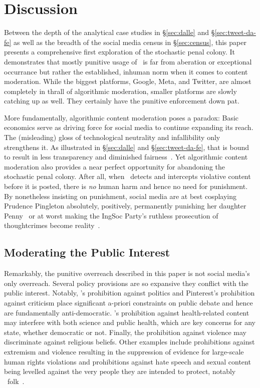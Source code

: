 \section{Discussion}
\label{sec:discussion}

Between the depth of the analytical case studies in \S\ref{sec:dalle} and
\S\ref{sec:tweet-da-fe} as well as the breadth of the social media census in
\S\ref{sec:census}, this paper presents a comprehensive first exploration of the
stochastic penal colony. It demonstrates that mostly punitive usage of \AI\ is
far from aberation or exceptional occurrance but rather the established, inhuman
norm when it comes to content moderation. While the biggest platforms, Google,
Meta, and Twitter, are almost completely in thrall of algorithmic moderation,
smaller platforms are slowly catching up as well. They certainly have the
punitive enforcement down pat.

More fundamentally, algorithmic content moderation poses a paradox: Basic
economics serve as driving force for social media to continue expanding its
reach. The (misleading) gloss of technological neutrality and infallibility only
strengthens it. As illustrated in \S\ref{sec:dalle} and \S\ref{sec:tweet-da-fe},
that is bound to result in less transparency and diminished
fairness~\cite{GorwaBinnsea2020}. Yet algorithmic content moderation also
provides a near perfect opportunity for abandoning the stochastic penal colony.
After all, when \AI\ detects and intercepts violative content before it is
posted, there is \emph{no} human harm and hence no need for punishment. By
nonetheless insisting on punishment, social media are at best cosplaying
Prudence Pingleton absolutely, positively, permanently punishing her daughter
Penny~\cite{Waters1988} or at worst making the IngSoc Party's ruthless
prosecution of thoughtcrimes become reality~\cite{Orwell1949}.


\subsection{Moderating the Public Interest}

Remarkably, the punitive overreach described in this paper is not social media's
only overreach. Several policy provisions are so expansive they conflict with
the public interest. Notably, \DALLE's prohibition against politics and
Pinterest's prohibition against criticism place significant a-priori constraints
on public debate and hence are fundamentally anti-democratic. \DALLE's
prohibition against health-related content may interfere with both science and
public health, which are key concerns for any state, whether democratic or not.
Finally, the prohibition against violence may discriminate against religious
beliefs. Other examples include prohibitions against extremism and violence
resulting in the suppression of evidence for large-scale human rights violations
and prohibitions against hate speech and sexual content being levelled against
the very people they are intended to protect, notably \LGBT\
folk~\cite{EidelmanLeeea2021,RahmanAlJaloudAlKhatibea2019,Wille2020}.

